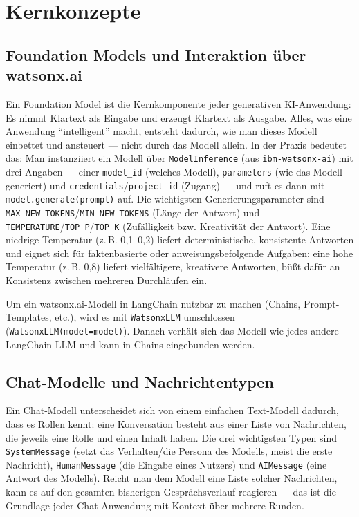 \section{Kernkonzepte}

\subsection{Foundation Models und Interaktion über watsonx.ai}

Ein Foundation Model ist die Kernkomponente jeder generativen KI-Anwendung: Es nimmt
Klartext als Eingabe und erzeugt Klartext als Ausgabe. Alles, was eine Anwendung
\enquote{intelligent} macht, entsteht dadurch, wie man dieses Modell einbettet und ansteuert ---
nicht durch das Modell allein. In der Praxis bedeutet das: Man instanziiert ein Modell
über \texttt{ModelInference} (aus \texttt{ibm-watsonx-ai}) mit drei Angaben --- einer
\texttt{model\_id} (welches Modell), \texttt{parameters} (wie das Modell generiert) und
\texttt{credentials}/\texttt{project\_id} (Zugang) --- und ruft es dann mit
\texttt{model.generate(prompt)} auf. Die wichtigsten Generierungsparameter sind
\texttt{MAX\_NEW\_TOKENS}/\texttt{MIN\_NEW\_TOKENS} (Länge der Antwort) und
\texttt{TEMPERATURE}/\texttt{TOP\_P}/\texttt{TOP\_K} (Zufälligkeit bzw. Kreativität der
Antwort). Eine niedrige Temperatur (z.\,B. 0{,}1--0{,}2) liefert deterministische,
konsistente Antworten und eignet sich für faktenbasierte oder anweisungsbefolgende
Aufgaben; eine hohe Temperatur (z.\,B. 0{,}8) liefert vielfältigere, kreativere Antworten,
büßt dafür an Konsistenz zwischen mehreren Durchläufen ein.

Um ein watsonx.ai-Modell in LangChain nutzbar zu machen (Chains, Prompt-Templates, etc.),
wird es mit \texttt{WatsonxLLM} umschlossen (\texttt{WatsonxLLM(model=model)}). Danach
verhält sich das Modell wie jedes andere LangChain-LLM und kann in Chains eingebunden
werden.

\subsection{Chat-Modelle und Nachrichtentypen}

Ein Chat-Modell unterscheidet sich von einem einfachen Text-Modell dadurch, dass es
Rollen kennt: eine Konversation besteht aus einer Liste von Nachrichten, die jeweils eine
Rolle und einen Inhalt haben. Die drei wichtigsten Typen sind \texttt{SystemMessage}
(setzt das Verhalten/die Persona des Modells, meist die erste Nachricht),
\texttt{HumanMessage} (die Eingabe eines Nutzers) und \texttt{AIMessage} (eine Antwort
des Modells). Reicht man dem Modell eine Liste solcher Nachrichten, kann es auf den
gesamten bisherigen Gesprächsverlauf reagieren --- das ist die Grundlage jeder
Chat-Anwendung mit Kontext über mehrere Runden.

